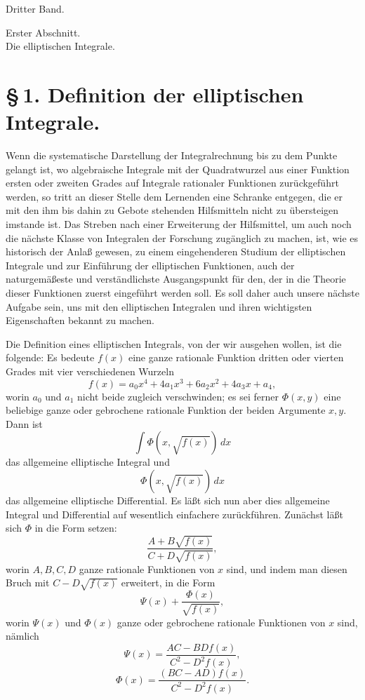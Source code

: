 \documentclass[11pt]{article}
\begin{document}
\begin{center}{\large Dritter Band.}\end{center}
\begin{center}
{\large Erster Abschnitt.}\\[0.7em]
{\Large Die elliptischen Integrale.}
\end{center}

\section*{\S\,1. Definition der elliptischen Integrale.}

Wenn die systematische Darstellung der Integralrechnung bis zu dem Punkte gelangt ist, wo algebraische Integrale mit der Quadratwurzel aus einer Funktion ersten oder zweiten Grades auf Integrale rationaler Funktionen zurückgeführt werden, so tritt an dieser Stelle dem Lernenden eine Schranke entgegen, die er mit den ihm bis dahin zu Gebote stehenden Hilfsmitteln nicht zu übersteigen imstande ist. Das Streben nach einer Erweiterung der Hilfsmittel, um auch noch die nächste Klasse von Integralen der Forschung zugänglich zu machen, ist, wie es historisch der Anlaß gewesen, zu einem eingehenderen Studium der elliptischen Integrale und zur Einführung der elliptischen Funktionen, auch der naturgemäßeste und verständlichste Ausgangspunkt für den, der in die Theorie dieser Funktionen zuerst eingeführt werden soll. Es soll daher auch unsere nächste Aufgabe sein, uns mit den elliptischen Integralen und ihren wichtigsten Eigenschaften bekannt zu machen.

Die Definition eines elliptischen Integrals, von der wir ausgehen wollen, ist die folgende: Es bedeute $f(x)$ eine ganze rationale Funktion dritten oder vierten Grades mit vier verschiedenen Wurzeln
\begin{equation}
f(x)=a_0x^4+4a_1x^3+6a_2x^2+4a_3x+a_4,
\tag{1}
\end{equation}
worin $a_0$ und $a_1$ nicht beide zugleich verschwinden; es sei ferner $\Phi(x,y)$ eine beliebige ganze oder gebrochene rationale Funktion der beiden Argumente $x,y$. Dann ist
\[
\int \Phi(x,\sqrt{f(x)})\,dx
\]
das allgemeine elliptische Integral und
\[
\Phi(x,\sqrt{f(x)})\,dx
\]
das allgemeine elliptische Differential. Es läßt sich nun aber dies allgemeine Integral und Differential auf wesentlich einfachere zurückführen. Zunächst läßt sich $\Phi$ in die Form setzen:
\[
\frac{A+B\sqrt{f(x)}}{C+D\sqrt{f(x)}},
\]
worin $A,B,C,D$ ganze rationale Funktionen von $x$ sind, und indem man diesen Bruch mit $C-D\sqrt{f(x)}$ erweitert, in die Form
\[
\Psi(x)+\frac{\Phi(x)}{\sqrt{f(x)}},
\]
worin $\Psi(x)$ und $\Phi(x)$ ganze oder gebrochene rationale Funktionen von $x$ sind, nämlich
\[
\Psi(x)=\frac{AC-BD f(x)}{C^2-D^2 f(x)},
\]
\[
\Phi(x)=\frac{(BC-AD)f(x)}{C^2-D^2 f(x)}.
\]
\end{document}
